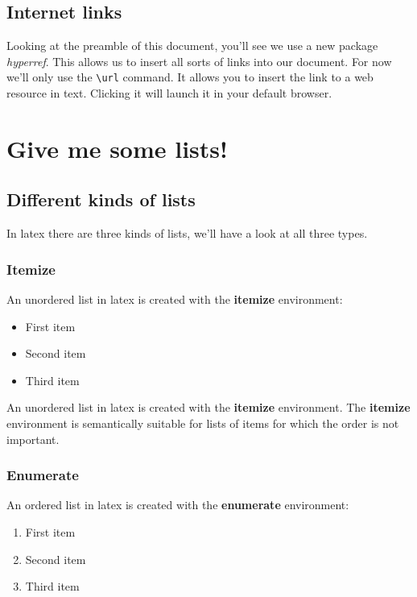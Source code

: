 \documentclass[a4paper]{report}
\begin{document}
\section{Internet links}

Looking at the preamble of this document, you'll see we use a new package
\textit{hyperref}. This allows us to insert all sorts of links into our
document. For now we'll only use the \verb`\url` command. It allows you to
insert the link to a web resource in text. Clicking it will launch it in your
default browser.


\chapter{Give me some lists!}

\section{Different kinds of lists}

In latex there are three kinds of lists, we'll have a look at all three types.

\subsection{Itemize}

An unordered list in latex is created with the \textbf{itemize} environment:

\begin{itemize}
    \item First item
    \item Second item
    \item Third item
\end{itemize}

An unordered list in latex is created with the \textbf{itemize} environment.
The \textbf{itemize} environment is semantically suitable for lists of items
for which the order is not important.


\subsection{Enumerate}

An ordered list in latex is created with the \textbf{enumerate} environment:

\begin{enumerate}
    \item First item
    \item Second item
    \item Third item
\end{enumerate}
\end{document}
